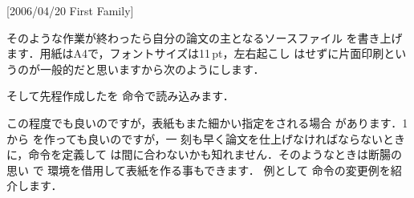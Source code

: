 \begin{InTeX}
[2006/04/20 First Family]
\RequirePackage{txfonts}%
\setlength\textwidth{40zw}%
\setlength\fullwidth{\textwidth}%
\setlength{}%
\setlength{}%
\setlength{}
\setlength{}
\setlength\oddsidemargin{\evensidemargin}
\setlength{}
\setlength{}
\setlength{}
\setlength{}
\setlength{}
\setlength{}
\setlength{}%
\def\ps@foot{%
 \let\@mkboth\@gobbletwo
 \let\@oddhead\@empty
 \let\@evenhead\@empty
 \def\@oddfoot{\normalfont\hfil-- \thepage\ --\hfil}%
 \let\@evenfoot\@oddfoot
}
\pagestyle{plainfoot}%
\renewcommand{\headfont}{\normalfont\bfseries}
\setcounter{tocdepth}{2}
\end{InTeX}

そのような作業が終わったら自分の論文の主となるソースファイル
を書き上げます．用紙はA4で，フォントサイズは11\,pt，左右起こし
はせずに片面印刷というのが一般的だと思いますから次のようにします．


そして先程作成したを 命令で読み込みます．

\begin{InTeX}
\usepackage{mygs}
\end{InTeX}


この程度でも良いのですが，表紙もまた細かい指定をされる場合
があります．1から を作っても良いのですが，一
刻も早く論文を仕上げなければならないときに，命令を定義して
は間に合わないかも知れません．そのようなときは断腸の思い
で 環境を借用して表紙を作る事もできます．%
%
例として 命令の変更例を紹介します．

